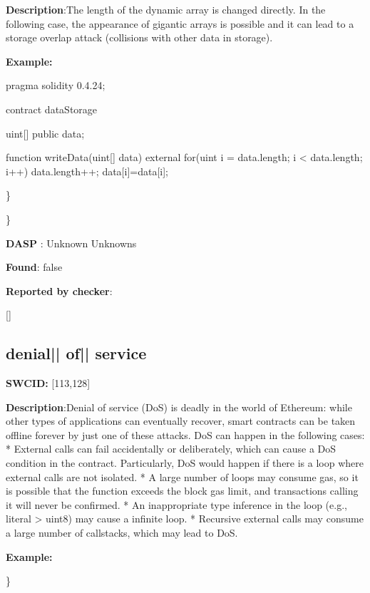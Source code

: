 \documentclass{article}
\begin{document}
\textbf{Description}:The length of the dynamic array is changed directly. In the following case, the appearance of gigantic arrays is possible and it can lead to a storage overlap attack (collisions with other data in storage).


\textbf{Example:} 
\begin{ffcode} 

pragma solidity 0.4.24;

contract dataStorage {
    uint[] public data;

    function writeData(uint[] \textunderscore data) external {
        for(uint i = data.length; i < \textunderscore data.length; i++) {
            data.length++;
            data[i]=\textunderscore data[i];
        }
    }
}

\end{ffcode} 
\} 

\} 

\textbf{DASP} : Unknown Unknowns

\textbf{Found}: false

\textbf{Reported by checker}: 
\begin{ffcode} 

[]
\end{ffcode} 
\subsection{denial{|\textunderscore| }of{|\textunderscore| }service} 
\textbf{SWC{\textunderscore }ID:} [113,128]

\textbf{Description}:Denial of service (DoS) is deadly in the world of Ethereum: while other types of applications can eventually recover, smart contracts can be taken offline forever by just one of these attacks. DoS can happen in the following cases:
* External calls can fail accidentally or deliberately, which can cause a DoS condition in the contract. Particularly, DoS would happen if there is a loop where external calls are not isolated.
* A large number of loops may consume gas, so it is possible that the function exceeds the block gas limit, and transactions calling it will never be confirmed.
* An inappropriate type inference in the loop (e.g., literal {\textendash}> uint8) may cause a infinite loop.
* Recursive external calls may consume a large number of callstacks, which may lead to DoS.


\textbf{Example:} 
\begin{ffcode} 

for (var i = 0; i < array.length; i++) { /* ... */

\end{ffcode} 
\} 
\end{document}
